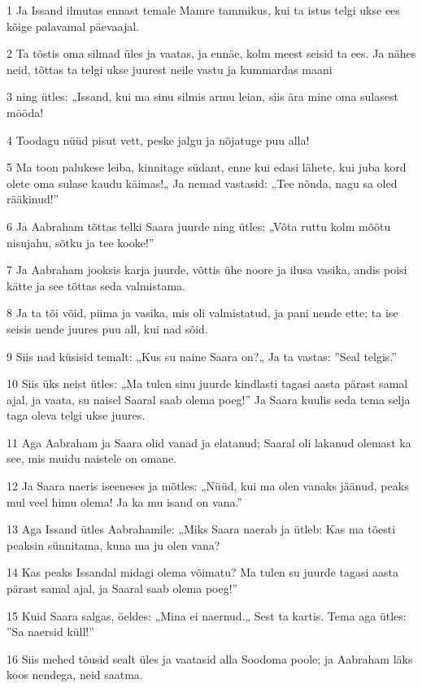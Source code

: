 \par 1 Ja Issand ilmutas ennast temale Mamre tammikus, kui ta istus telgi ukse ees kõige palavamal päevaajal.
\par 2 Ta tõstis oma silmad üles ja vaatas, ja ennäe, kolm meest seisid ta ees. Ja nähes neid, tõttas ta telgi ukse juurest neile vastu ja kummardas maani
\par 3 ning ütles: „Issand, kui ma sinu silmis armu leian, siis ära mine oma sulasest mööda!
\par 4 Toodagu nüüd pisut vett, peske jalgu ja nõjatuge puu alla!
\par 5 Ma toon palukese leiba, kinnitage südant, enne kui edasi lähete, kui juba kord olete oma sulase kaudu käimas!„ Ja nemad vastasid: „Tee nõnda, nagu sa oled rääkinud!”
\par 6 Ja Aabraham tõttas telki Saara juurde ning ütles: „Võta ruttu kolm mõõtu nisujahu, sõtku ja tee kooke!”
\par 7 Ja Aabraham jooksis karja juurde, võttis ühe noore ja ilusa vasika, andis poisi kätte ja see tõttas seda valmistama.
\par 8 Ja ta tõi võid, piima ja vasika, mis oli valmistatud, ja pani nende ette; ta ise seisis nende juures puu all, kui nad sõid.
\par 9 Siis nad küsisid temalt: „Kus su naine Saara on?„ Ja ta vastas: ”Seal telgis.”
\par 10 Siis üks neist ütles: „Ma tulen sinu juurde kindlasti tagasi aasta pärast samal ajal, ja vaata, su naisel Saaral saab olema poeg!” Ja Saara kuulis seda tema selja taga oleva telgi ukse juures.
\par 11 Aga Aabraham ja Saara olid vanad ja elatanud; Saaral oli lakanud olemast ka see, mis muidu naistele on omane.
\par 12 Ja Saara naeris iseeneses ja mõtles: „Nüüd, kui ma olen vanaks jäänud, peaks mul veel himu olema! Ja ka mu isand on vana.”
\par 13 Aga Issand ütles Aabrahamile: „Miks Saara naerab ja ütleb: Kas ma tõesti peaksin sünnitama, kuna ma ju olen vana?
\par 14 Kas peaks Issandal midagi olema võimatu? Ma tulen su juurde tagasi aasta pärast samal ajal, ja Saaral saab olema poeg!”
\par 15 Kuid Saara salgas, öeldes: „Mina ei naernud.„ Sest ta kartis. Tema aga ütles: ”Sa naersid küll!”
\par 16 Siis mehed tõusid sealt üles ja vaatasid alla Soodoma poole; ja Aabraham läks koos nendega, neid saatma.

